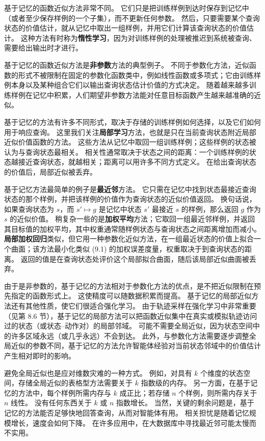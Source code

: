 \documentclass[UTF8,12pt,a4paper,fontset=fandol]{ctexart}
\begin{document}
基于记忆的函数近似方法非常不同。
它们只是把训练样例到达时保存到记忆中（或者至少保存样例的一个子集），而不更新任何参数。
然后，只要需要某个查询状态的价值估计，就从记忆中取出一组样例，并用它们计算该查询状态的价值估计。
这种方法有时称为\textbf{惰性学习}，因为对训练样例的处理被推迟到系统被查询、需要给出输出时才进行。

基于记忆的函数近似方法是\textbf{非参数}方法的典型例子。
不同于参数化方法，近似函数的形式不被限制在固定的参数化函数类中，例如线性函数或多项式；它由训练样例本身以及某种组合它们以输出查询状态估计价值的方式决定。
随着越来越多训练样例在记忆中积累，人们期望非参数方法能对任意目标函数产生越来越准确的近似。

基于记忆的方法有许多不同形式，取决于存储的训练样例如何选择，以及它们如何用于响应查询。
这里我们关注\textbf{局部学习}方法，也就是只在当前查询状态附近局部近似价值函数的方法。
这些方法从记忆中取回一组训练样例；这些样例的状态被认为与查询状态最相关。
相关性通常取决于状态之间的距离：一个训练样例的状态越接近查询状态，就越相关；距离可以用许多不同方式定义。
在给出查询状态的价值后，局部近似被丢弃。

基于记忆方法最简单的例子是\textbf{最近邻}方法。
它只需在记忆中找到状态最接近查询状态的那个样例，并把该样例的价值作为查询状态的近似价值返回。
换句话说，如果查询状态为 $s$，而 $s'\mapsto g$ 是记忆中状态 $s'$ 最接近 $s$ 的样例，那么返回 $g$ 作为 $s$ 的近似价值。
稍复杂一些的是\textbf{加权平均}方法；它取回一组最近邻样例，并返回其目标值的加权平均，其中权重通常随样例状态与查询状态之间距离增加而减小。
\textbf{局部加权回归}类似，但它用一种参数化近似方法，在一组最近状态的价值上拟合一个曲面；该方法最小化类似 (9.1) 的加权误差度量，权重取决于到查询状态的距离。
返回的值是在查询状态处评价这个局部拟合曲面，随后该局部近似曲面被丢弃。

由于是非参数的，基于记忆的方法相对于参数化方法的优点，是不把近似限制在预先指定的函数形式上。
这使精度可以随数据积累而提高。
基于记忆的局部近似方法还有其他性质，使它们很适合强化学习。
由于轨迹采样在强化学习中非常重要（见第 8.6 节），基于记忆的局部方法可以把函数近似集中在真实或模拟轨迹访问过的状态（或状态--动作对）的局部邻域。
可能不需要全局近似，因为状态空间中的许多区域永远（或几乎永远）不会到达。
此外，与参数化方法需要逐步调整全局近似的参数不同，基于记忆的方法允许智能体经验对当前状态邻域中的价值估计产生相对即时的影响。

避免全局近似也是应对维数灾难的一种方式。
例如，对具有 $k$ 个维度的状态空间，存储全局近似的表格型方法需要关于 $k$ 指数级的内存。
另一方面，在基于记忆的方法中，每个样例所需内存与 $k$ 成正比；若存储 $n$ 个样例，则所需内存关于 $n$ 线性。
没有任何东西关于 $k$ 或 $n$ 指数增长。
当然，关键的剩余问题是，基于记忆的方法能否足够快地回答查询，从而对智能体有用。
相关担忧是随着记忆规模增长，速度会如何下降。
在许多应用中，在大数据库中寻找最近邻可能太慢而不实用。
\end{document}
